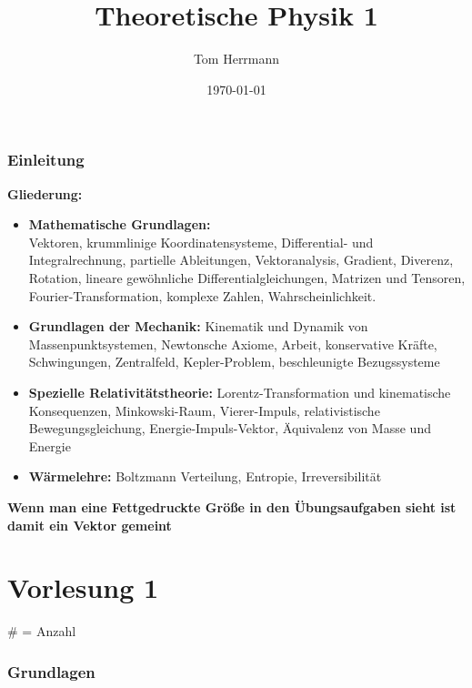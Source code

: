 \documentclass[11pt]{article}
\title{Theoretische Physik 1}
\date{\today}
\begin{document}
\lstset{language=Java}
\author{Tom Herrmann}
\linespread{1.55}
\maketitle

\tableofcontents
\newpage

\section{Einleitung}
	\textbf{Gliederung:}
	\begin{itemize}
		\item \textbf{Mathematische Grundlagen:}\\Vektoren, krummlinige Koordinatensysteme, Differential- und Integralrechnung, partielle Ableitungen, Vektoranalysis, Gradient, Diverenz, Rotation, lineare gewöhnliche Differentialgleichungen, Matrizen und Tensoren, Fourier-Transformation, komplexe Zahlen, Wahrscheinlichkeit.
		\item \textbf{Grundlagen der Mechanik:} Kinematik und Dynamik von Massenpunktsystemen, Newtonsche Axiome, Arbeit, konservative Kräfte, Schwingungen, Zentralfeld, Kepler-Problem, beschleunigte Bezugssysteme
		\item \textbf{Spezielle Relativitätstheorie:}  Lorentz-Transformation und kinematische Konsequenzen, Minkowski-Raum, Vierer-Impuls, relativistische Bewegungsgleichung, Energie-Impuls-Vektor, Äquivalenz von Masse und Energie
		\item \textbf{Wärmelehre: } Boltzmann Verteilung, Entropie, Irreversibilität
	\end{itemize}
		\textbf{Wenn man eine Fettgedruckte Größe in den Übungsaufgaben sieht ist damit ein Vektor gemeint}
\part{Vorlesung 1}
	$\#$ = Anzahl
	\section{Grundlagen}
\end{document}
